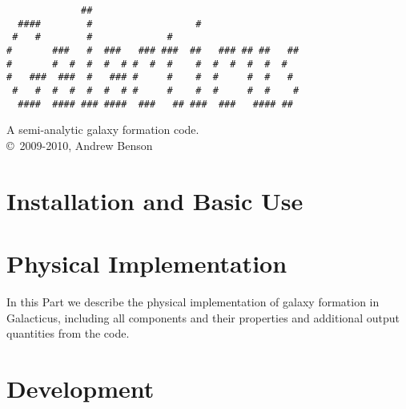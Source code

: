 \documentclass[letterpaper,10pt]{book}
\def\glc{{\sc Galacticus}}
\begin{document}
\lstset{language=[95]Fortran}

\frontmatter

\pagestyle{empty}
\begin{center}
\begin{minipage}{7cm}
\begin{verbatim}
             ##                                     
  ####        #                  #                  
 #   #        #             #                       
#       ###   #  ###   ### ###  ##   ### ## ##   ## 
#       #  #  #  #  # #  #  #    #  #  #  #  #  #   
#   ###  ###  #   ### #     #    #  #     #  #   #  
 #   #  #  #  #  #  # #     #    #  #     #  #    # 
  ####  #### ### ####  ###   ## ###  ###   #### ##  

\end{verbatim}
\end{minipage}
\newline
A semi-analytic galaxy formation code.\\

\copyright\ 2009-2010, Andrew Benson
\end{center}

\tableofcontents

\mainmatter

\part{Installation and Basic Use}













\part{Physical Implementation}

In this Part we describe the physical implementation of galaxy formation in \glc, including all components and their properties and additional output quantities from the code.







\part{Development}
\end{document}
